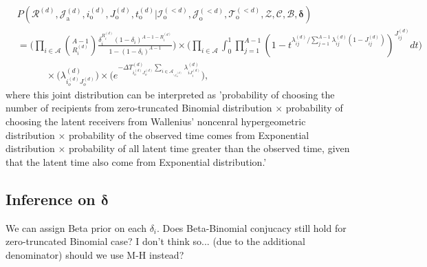 \documentclass[a4paper]{article}
\begin{document}
\begin{equation}
\begin{aligned}
&P(\mathcal{R}^{(d)},\mathcal{J}^{(d)}_{\mbox{a}}, i^{(d)}_{\mbox{o}}, J^{(d)}_{\mbox{o}}, t^{(d)}_{\mbox{o}} |\mathcal{I}^{(<d)}_{\mbox{o}}, \mathcal{J}^{(<d)}_{\mbox{o}}, \mathcal{T}^{(<d)}_{\mbox{o}}, \mathcal{Z}, \mathcal{C}, \mathcal{B}, \boldsymbol{\delta})\\&=\Big(\prod_{i\in \mathcal{A}} {{A-1}\choose R_i^{(d)}} \frac{\delta_i^{ R_i^{(d)}} (1-\delta_i)^{A-1-R_i^{(d)}}}{1 - (1-\delta_i)^{A-1}}\Big) \times \Big(\prod_{i\in \mathcal{A}}\int_0^1\prod_{j=1}^{A-1}(1-t^{\lambda_{ij}^{(d)} /  \sum_{j = 1}^{A-1} \lambda_{ij}^{(d)}(1-J_{ij}^{(d)})})^{J_{ij}^{(d)}}dt \Big)\\&\quad\quad\quad\times \Big(\lambda^{(d)}_{i_o^{(d)}J_{o}^{(d)}}\Big)\times  \Big(e^{-\Delta T^{(d)}_{i_o^{(d)}J_o^{(d)}}\sum\limits_{i\in \mathcal{A}_{\backslash i_o^{(d)}}}\lambda^{(d)}_{iJ^{(d)}_{i}}}\Big),
\end{aligned}
\end{equation}
where this joint distribution can be interpreted as 'probability of choosing the number of recipients from zero-truncated Binomial distribution $\times$ probability of choosing the latent receivers from Wallenius' noncenral hypergeometric distribution $\times$ probability of the observed time comes from Exponential distribution $\times$ probability of all latent time greater than the observed time, given that the latent time also come from Exponential distribution.'
 \subsection{Inference on $\boldsymbol{\delta}$}
 We can assign Beta prior on each $\delta_i$. Does Beta-Binomial conjucacy still hold for zero-truncated Binomial case? I don't think so... (due to the additional denominator) should we use M-H instead?
\end{document}
